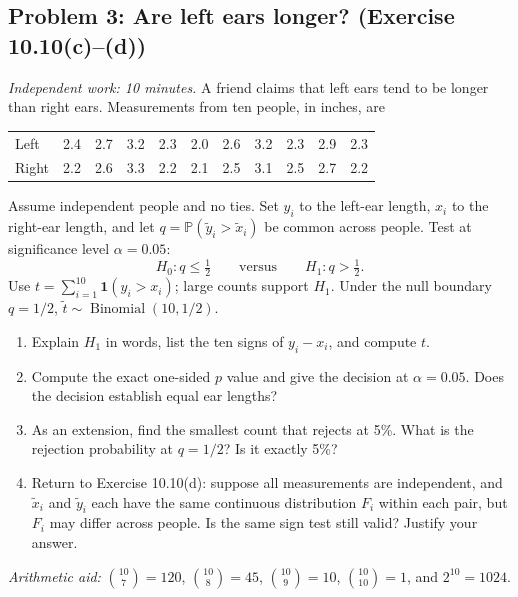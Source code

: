 \documentclass[11pt]{article}
\newcommand{\rv}[1]{\widetilde{#1}}
\newcommand{\Pbb}{\mathbb P}
\newcommand{\workingspace}[1]{}
\newcommand{\workingspace}[1]{\vspace{#1}}
\begin{document}
\subsection*{Problem 3: Are left ears longer? (Exercise 10.10(c)--(d))}
\noindent\textit{Independent work: 10 minutes.}
A friend claims that left ears tend to be longer than right ears.
Measurements from ten people, in inches, are
\begin{center}
\begin{tabular}{@{}l*{10}{r}@{}}
\toprule
Left  &2.4&2.7&3.2&2.3&2.0&2.6&3.2&2.3&2.9&2.3\\
Right &2.2&2.6&3.3&2.2&2.1&2.5&3.1&2.5&2.7&2.2\\
\bottomrule
\end{tabular}
\end{center}
Assume independent people and no ties. Set $y_i$ to the left-ear length,
$x_i$ to the right-ear length, and let $q=\Pbb(\rv y_i>\rv x_i)$ be common
across people. Test at significance level $\alpha=0.05$:
\[
 \boxed{H_0:q\leq\tfrac12\qquad\text{versus}\qquad H_1:q>\tfrac12.}
\]
Use $t=\sum_{i=1}^{10}\mathbf 1(y_i>x_i)$; large counts support $H_1$.
Under the null boundary $q=1/2$, $\rv t\sim\operatorname{Binomial}(10,1/2)$.
\begin{enumerate}
 \item Explain $H_1$ in words, list the ten signs of $y_i-x_i$, and compute $t$.
 \item Compute the exact one-sided $p$ value and give the decision at
 $\alpha=0.05$. Does the decision establish equal ear lengths?
 \item As an extension, find the smallest count that rejects at 5\%.
 What is the rejection probability at $q=1/2$? Is it exactly 5\%?
 \item Return to Exercise 10.10(d): suppose all measurements are
 independent, and $\rv x_i$ and $\rv y_i$ each have the same continuous
 distribution $F_i$ within each pair, but $F_i$ may differ across people.
 Is the same sign test still valid? Justify your answer.
\end{enumerate}
\noindent\textit{Arithmetic aid:}
$\binom{10}{7}=120$, $\binom{10}{8}=45$,
$\binom{10}{9}=10$, $\binom{10}{10}=1$, and $2^{10}=1024$.
\workingspace{8cm}
\end{document}
